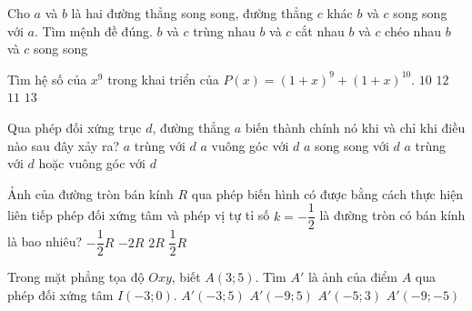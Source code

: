 \begin{ex}%
Cho $ a $ và $ b $ là hai đường thẳng song song, đường thẳng $ c $ khác $ b $ và $ c $ song song với $ a $. Tìm mệnh đề đúng.
\choice
{$ b$ và $c $ trùng nhau}
{$ b $ và $ c $ cắt nhau}
{$ b $ và $ c $ chéo nhau}
{\True $ b $ và $ c $ song song}
\end{ex}

\begin{ex}%
Tìm hệ số của $ x^9 $ trong khai triển của $ P(x)=(1+x)^9+(1+x)^{10}. $
\choice
{$ 10 $}
{$ 12 $}
{\True $ 11 $}
{$ 13 $}
\end{ex}


\begin{ex}%
Qua phép đối xứng trục $ d $, đường thẳng $ a $ biến thành chính nó khi và chỉ khi điều nào sau đây xảy ra?
\choice
{$ a $ trùng với $ d $}
{$ a $ vuông góc với $ d $}
{$ a $ song song với $ d $ }
{\True $ a $ trùng với $ d $ hoặc vuông góc với $ d $}
\end{ex}


\begin{ex}%
Ảnh của đường tròn bán kính $ R $ qua phép biến hình có được bằng cách thực hiện liên tiếp phép đối xứng tâm và phép vị tự tỉ số $ k=-\dfrac{1}{2} $ là đường tròn có bán kính là bao nhiêu?
\choice
{$ -\dfrac{1}{2}R $}
{$ -2R $}
{$ 2R $}
{\True $ \dfrac{1}{2}R $}
\end{ex}


\begin{ex}%
Trong mặt phẳng tọa độ $ Oxy $, biết $ A(3;5) $. Tìm $ A' $ là ảnh của điểm $ A $ qua phép đối xứng tâm $ I(-3;0) $.
\choice
{$ A'(-3;5) $ }
{$ A'(-9;5) $ }
{$ A'(-5;3) $ }
{\True $ A'(-9;-5) $ }
\end{ex}


